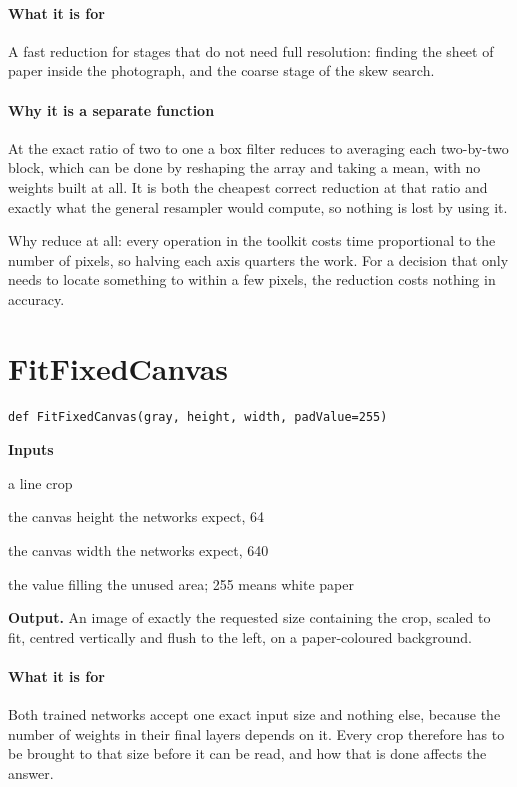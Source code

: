 \paragraph{What it is for}
A fast reduction for stages that do not need full resolution: finding the sheet of paper inside the photograph, and the coarse stage of the skew search.


\paragraph{Why it is a separate function}
At the exact ratio of two to one a box filter reduces to averaging each two-by-two block, which can be done by reshaping the array and taking a mean, with no weights built at all. It is both the cheapest correct reduction at that ratio and exactly what the general resampler would compute, so nothing is lost by using it.

Why reduce at all: every operation in the toolkit costs time proportional to the number of pixels, so halving each axis quarters the work. For a decision that only needs to locate something to within a few pixels, the reduction costs nothing in accuracy.


\section{FitFixedCanvas}
\begin{lstlisting}[style=sig]
def FitFixedCanvas(gray, height, width, padValue=255)
\end{lstlisting}

\noindent\textbf{Inputs}
\begin{description}[leftmargin=2.2em,style=nextline,font=\normalfont\ttfamily]\setlength\itemsep{1pt}
  \item[{gray}] \normalfont a line crop
  \item[{height}] \normalfont the canvas height the networks expect, 64
  \item[{width}] \normalfont the canvas width the networks expect, 640
  \item[{padValue}] \normalfont the value filling the unused area; 255 means white paper
\end{description}

\noindent\textbf{Output.} An image of exactly the requested size containing the crop, scaled to fit, centred vertically and flush to the left, on a paper-coloured background.


\paragraph{What it is for}
Both trained networks accept one exact input size and nothing else, because the number of weights in their final layers depends on it. Every crop therefore has to be brought to that size before it can be read, and how that is done affects the answer.


